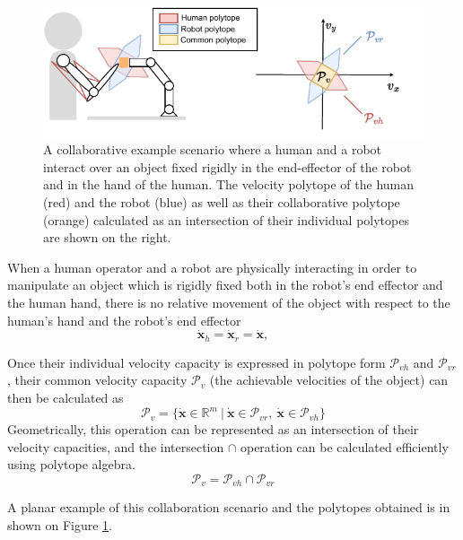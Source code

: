 \begin{figure}[!h]
    \centering
    \includegraphics[width=0.7\linewidth]{Chapters/imgs/velocity_collab.pdf}
    \caption{A collaborative example scenario where a human and a robot interact over an object fixed rigidly in the end-effector of the robot and in the hand of the human. The velocity polytope of the human (red) and the robot (blue) as well as their collaborative polytope (orange) calculated as an intersection of their individual polytopes are shown on the right.}
    \label{fig:collaboration_vel}
\end{figure}

When a human operator and a robot are physically interacting in order to manipulate an object which is rigidly fixed both in the robot's end effector and the human hand, there is no relative movement of the object with respect to the human's hand and the robot's end effector
\begin{equation}
    \dot{\bm{x}}_h=\dot{\bm{x}}_r=\dot{\bm{x}},
\end{equation}

Once their individual velocity capacity is expressed in polytope form $\mathcal{P}_{vh}$ and $\mathcal{P}_{vr}$, their common velocity capacity $\mathcal{P}_v$ (the achievable velocities of the object) can then be calculated as 
\begin{equation}
    \mathcal{P}_v = \{\dot{\bm{x}}\in \mathbb{R}^m ~|~ \dot{\bm{x}} \in \mathcal{P}_{vr},~\dot{\bm{x}} \in \mathcal{P}_{vh}\}
\end{equation}
Geometrically, this operation can be represented as an intersection of their velocity capacities, and the intersection $\cap$ operation can be calculated efficiently using polytope algebra. 
\begin{equation}
    \mathcal{P}_v =  \mathcal{P}_{vh} \cap \mathcal{P}_{vr}
\end{equation}

A planar example of this collaboration scenario and the polytopes obtained is in shown on Figure \ref{fig:collaboration_vel}. 



